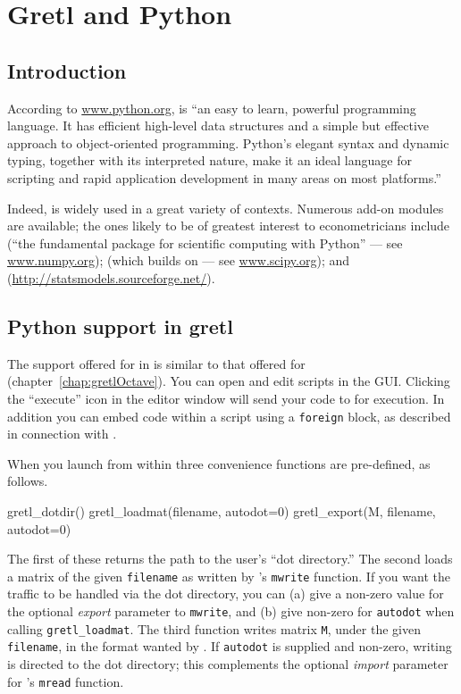 \chapter{Gretl and Python}
\label{chap:gretlPython}

\section{Introduction}
\label{Python-intro}

According to \url{www.python.org},  is ``an easy to learn,
powerful programming language. It has efficient high-level data
structures and a simple but effective approach to object-oriented
programming. Python's elegant syntax and dynamic typing, together with
its interpreted nature, make it an ideal language for scripting and
rapid application development in many areas on most platforms.''

Indeed,  is widely used in a great variety of
contexts. Numerous add-on modules are available; the ones likely to be
of greatest interest to econometricians include  (``the
fundamental package for scientific computing with Python'' --- see
\url{www.numpy.org});  (which builds on  --- see
\url{www.scipy.org}); and 
(\url{http://statsmodels.sourceforge.net/}).

\section{Python support in gretl}
\label{sec:Python-support}

The support offered for  in  is similar to that
offered for  (chapter~\ref{chap:gretlOctave}). You can
open and edit  scripts in the  GUI.  Clicking
the ``execute'' icon in the editor window will send your code to
 for execution. In addition you can embed 
code within a  script using a \texttt{foreign} block, as
described in connection with .

When you launch  from within  three convenience
functions are pre-defined, as follows.
\begin{code}
gretl_dotdir()
gretl_loadmat(filename, autodot=0)
gretl_export(M, filename, autodot=0)
\end{code}
The first of these returns the path to the user's ``dot directory.''
The second loads a matrix of the given \texttt{filename} as written by
's \texttt{mwrite} function. If you want the traffic to be
handled via the dot directory, you can (a) give a non-zero value for
the optional \textsl{export} parameter to \texttt{mwrite}, and (b)
give non-zero for \texttt{autodot} when calling \verb|gretl_loadmat|.
The third function writes matrix \texttt{M}, under the given
\texttt{filename}, in the format wanted by . If
\texttt{autodot} is supplied and non-zero, writing is directed to the
dot directory; this complements the optional \textsl{import} parameter
for 's \texttt{mread} function.

